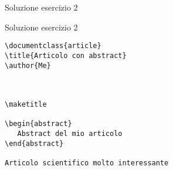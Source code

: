 \begin{frame}[fragile]{Soluzione esercizio 2}

\begin{soluzione}{Soluzione esercizio 2}
\begin{code}
\begin{verbatim}
\documentclass{article}
\title{Articolo con abstract}
\author{Me}



\maketitle 

\begin{abstract}
   Abstract del mio articolo
\end{abstract}

Articolo scientifico molto interessante


\end{verbatim}
\end{code}
\end{soluzione}

\end{frame}